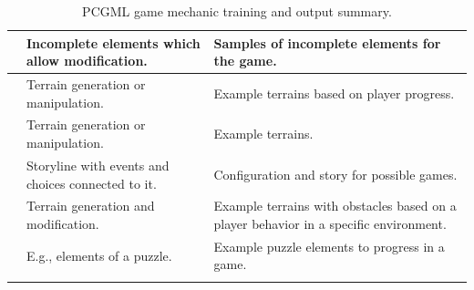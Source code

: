 \documentclass[MGS,Master,english]{twbook}%
\begin{document}
\begin{longtable}[c]{p{4cm}|p{5.5cm}|p{5.5cm}|}
		\multicolumn{1}{|p{4cm}|}{\textbf{\nameref{idea::buildingWithAssistance}}} & Incomplete elements which allow modification.        & Samples of incomplete elements for the game.                                          \\ \hline
		\multicolumn{1}{|p{4cm}|}{\textbf{\nameref{idea::exploringCoWorker}}}      & Terrain generation or manipulation.                  & Example terrains based on player progress.                                            \\ \hline
		\multicolumn{1}{|p{4cm}|}{\textbf{\nameref{idea::observeAndLearn}}}        & Terrain generation or manipulation.                  & Example terrains.                                                                     \\ \hline
		\multicolumn{1}{|p{4cm}|}{\textbf{\nameref{idea::expressYourself}} }       & Storyline with events and choices connected to it.   & Configuration and story for possible games.                                           \\ \hline
		\multicolumn{1}{|p{4cm}|}{\textbf{\nameref{idea::bigBossHelper}} }         & Terrain generation and modification.                 & Example terrains with obstacles based on a player behavior in a specific environment. \\ \hline
		\multicolumn{1}{|p{4cm}|}{\textbf{\nameref{idea::figureItOut}} }           & E.g., elements of a puzzle.                          & Example puzzle elements to progress in a game.                                        \\ \hline

	\caption{PCGML game mechanic training and output summary.}
\end{longtable}
\end{document}
